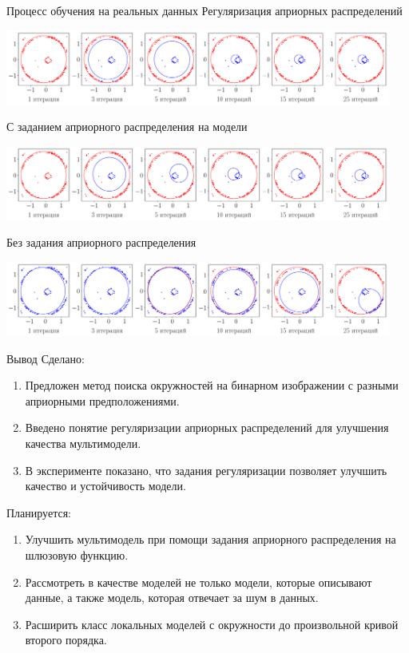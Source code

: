 \documentclass[9pt,pdf,hyperref={unicode}]{beamer}
\begin{document}
\begin{frame}{Процесс обучения на реальных данных}
\justifying
Регуляризация априорных распределений
\begin{center}
	\includegraphics[width=0.95\textwidth]{result/experiment_real_regular}
\end{center}
С заданием априорного распределения на модели
\begin{center}
	\includegraphics[width=0.95\textwidth]{result/experiment_real_prior}
\end{center}
Без задания априорного распределения
\begin{center}
	\includegraphics[width=0.95\textwidth]{result/experiment_real_not_prior}
\end{center}
\end{frame}
\begin{frame}{Вывод}
\justifying
Сделано:
	\begin{enumerate}
	\justifying
		\item Предложен метод поиска окружностей на бинарном изображении с разными априорными предположениями.
		\item Введено понятие регуляризации априорных распределений для улучшения качества мультимодели.
		\item В эксперименте показано, что задания регуляризации позволяет улучшить качество и устойчивость модели.
	\end{enumerate}

Планируется:
	\begin{enumerate}
	\justifying
		\item Улучшить мультимодель при помощи задания априорного распределения на шлюзовую функцию.
		\item Рассмотреть в качестве моделей не только модели, которые описывают данные, а также модель, которая отвечает за шум в данных.
		\item Расширить класс локальных моделей с окружности до произвольной кривой второго порядка.
	\end{enumerate}	

\end{frame}
\end{document}
